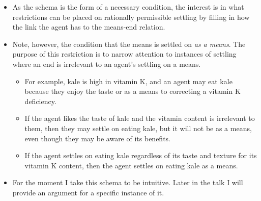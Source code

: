 \documentclass[10pt]{article}
\begin{document}
\begin{itemize}
\item As the schema is the form of a necessary condition, the interest is in what restrictions can be placed on rationally permissible settling by filling in how the link the agent has to the means-end relation.
\item Note, however, the condition that the means is settled on \emph{as a means}.
  The purpose of this restriction is to narrow attention to instances of settling where an end is irrelevant to an agent's settling on a means.
  \begin{itemize}
  \item For example, kale is high in vitamin K, and an agent may eat kale because they enjoy the taste or as a means to correcting a vitamin K deficiency.
  \item If the agent likes the taste of kale and the vitamin content is irrelevant to them, then they may settle on eating kale, but it will not be as a means, even though they may be aware of its benefits.
  \item If the agent settles on eating kale regardless of its taste and texture for its vitamin K content, then the agent settles on eating kale as a means.
  \end{itemize}
\end{itemize}

\begin{itemize}
\item For the moment I take this schema to be intuitive.
  Later in the talk I will provide an argument for a specific instance of it.
\end{itemize}


\end{document}
